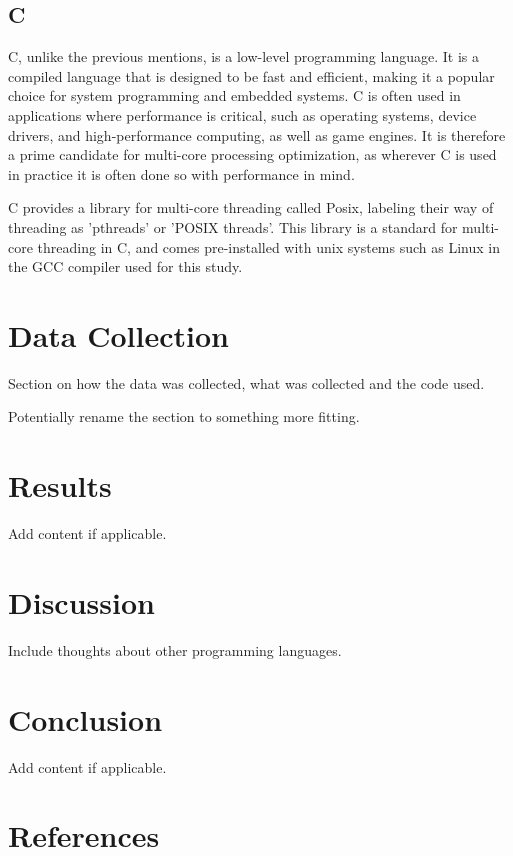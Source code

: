 \documentclass{article}
\begin{document}
\subsection{C}

C, unlike the previous mentions, is a low-level programming language. It is a compiled language that is designed to be fast and efficient, making it a popular choice for system programming and embedded systems. C is often used in applications where performance is critical, such as operating systems, device drivers, and high-performance computing, as well as game engines. It is therefore a prime candidate for multi-core processing optimization, as wherever C is used in practice it is often done so with performance in mind.

C provides a library for multi-core threading called Posix, labeling their way of threading as 'pthreads' or 'POSIX threads'. This library is a standard for multi-core threading in C, and comes pre-installed with unix systems such as Linux in the GCC compiler used for this study.

\section{Data Collection}

Section on how the data was collected, what was collected and the code used. 

Potentially rename the section to something more fitting.

\section{Results}

Add content if applicable.

\section{Discussion}

Include thoughts about other programming languages.

\section{Conclusion}

Add content if applicable.

\newpage
\section{References}
\printbibliography
\end{document}
